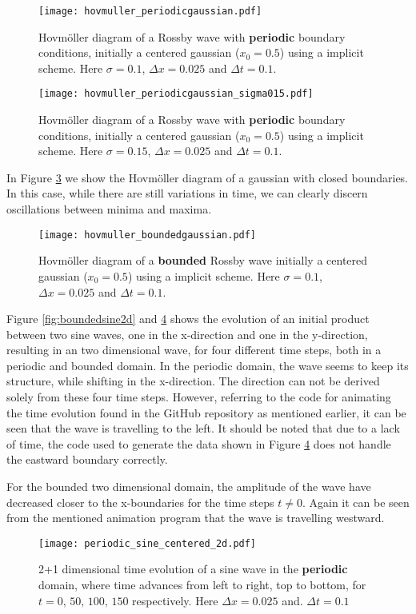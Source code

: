 \begin{figure}[htbp]
	\centering
	\texttt{[image: hovmuller\_periodicgaussian.pdf]}
	\caption{Hovmöller diagram of a Rossby wave with \textbf{periodic} boundary conditions, initially a centered gaussian ($x_0=0.5$) using a implicit scheme. Here $\sigma = 0.1$, $\Delta x = 0.025$ and $\Delta t = 0.1$.}
	\label{fig:hovmollerGaussianPeriodic}
\end{figure}

\begin{figure}[htbp]
	\centering
	\texttt{[image: hovmuller\_periodicgaussian\_sigma015.pdf]}
	\caption{Hovmöller diagram of a Rossby wave with \textbf{periodic} boundary conditions, initially a centered gaussian ($x_0=0.5$) using a implicit scheme. Here $\sigma = 0.15$, $\Delta x = 0.025$ and $\Delta t = 0.1$.}
	\label{fig:hovmollerGaussianPeriodic015}
\end{figure}

In Figure \ref{fig:hovmollerGaussianBounded} we show the Hovmöller diagram of a gaussian with closed boundaries. In this case, while there are still variations in time, we can clearly discern oscillations between minima and maxima.
\begin{figure}[htbp]
	\centering
	\texttt{[image: hovmuller\_boundedgaussian.pdf]}
	\caption{Hovmöller diagram of a \textbf{bounded} Rossby wave initially a centered gaussian ($x_0=0.5$) using a implicit scheme. Here $\sigma = 0.1$, $\Delta x = 0.025$ and $\Delta t = 0.1$.}
	\label{fig:hovmollerGaussianBounded}
\end{figure}

Figure \ref{fig:boundedsine2d} and \ref{fig:periodicsine2d} shows the evolution of an initial product between two sine waves, one in the x-direction and one in the y-direction, resulting in an two dimensional wave, for four different time steps, both in a periodic and bounded domain. In the periodic domain, the wave seems to keep its structure, while shifting in the x-direction. The direction can not be derived solely from these four time steps. However, referring to the code for animating the time evolution found in the GitHub repository as mentioned earlier, it can be seen that the wave is travelling to the left. It should be noted that due to a lack of time, the code used to generate the data shown in Figure \ref{fig:periodicsine2d} does not handle the eastward boundary correctly. 

For the bounded two dimensional domain, the amplitude of the wave have decreased closer to the x-boundaries for the time steps $t\neq 0$. Again it can be seen from the mentioned animation program that the wave is travelling westward. 
\begin{figure}[htbp]
	\centering
	\texttt{[image: periodic\_sine\_centered\_2d.pdf]}
	\caption{2+1 dimensional time evolution of a sine wave in the \textbf{periodic} domain, where time advances from left to right, top to bottom, for $t = 0,\, 50,\, 100,\, 150$ respectively. Here $\Delta x = 0.025$ and. $\Delta t = 0.1$}
	\label{fig:periodicsine2d}
\end{figure}


